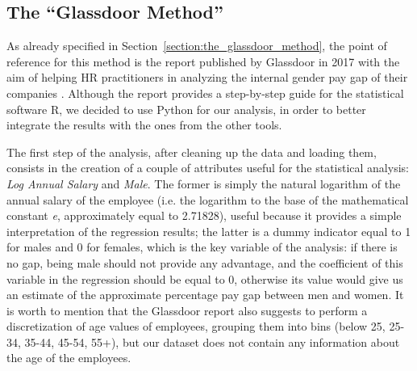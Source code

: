 \newpage
\subsection{The ``Glassdoor Method''}
As already specified in Section~\ref{section:the_glassdoor_method}, the point of reference for this method is the report published by Glassdoor in 2017 with the aim of helping HR practitioners in analyzing the internal gender pay gap of their companies \cite{chamberlain2017analyze}. Although the report provides a step-by-step guide for the statistical software R, we decided to use Python for our analysis, in order to better integrate the results with the ones from the other tools.

The first step of the analysis, after cleaning up the data and loading them, consists in the creation of a couple of attributes useful for the statistical analysis: \textit{Log Annual Salary} and \textit{Male}. The former is simply the natural logarithm of the annual salary of the employee (i.e. the logarithm to the base of the mathematical constant \textit{e}, approximately equal to 2.71828), useful because it provides a simple interpretation of the regression results; the latter is a dummy indicator equal to 1 for males and 0 for females, which is the key variable of the analysis: if there is no gap, being male should not provide any advantage, and the coefficient of this variable in the regression should be equal to 0, otherwise its value would give us an estimate of the approximate percentage pay gap between men and women. It is worth to mention that the Glassdoor report also suggests to perform a discretization of age values of employees, grouping them into bins (below 25, 25-34, 35-44, 45-54, 55+), but our dataset does not contain any information about the age of the employees.


